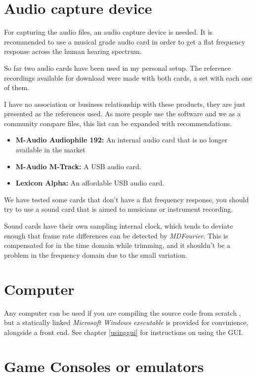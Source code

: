 \documentclass[10pt,a4paper]{report}
\begin{document}
\begin{appendices}
\section{Audio capture device}
\label{audiocards}
For capturing the audio files, an audio capture device is needed. It is recommended to use a musical grade audio card in order to get a flat frequency response across the human hearing spectrum.

So far two audio cards have been used in my personal setup. The reference recordings available for download were made with both cards, a set with each one of them.

I have no association or business relationship with these products, they are just presented as the references used. As more people use the software and we as a community compare files, this list can be expanded with recommendations.

\begin{itemize}
	\item \textbf{M-Audio Audiophile 192:} An internal audio card that is no longer available in the market \cite{maudio}
	\item \textbf{M-Audio M-Track:} A USB audio card. \cite{maudiomtrack}
	\item \textbf{Lexicon Alpha:} An affordable USB audio card. \cite{lexicon}
\end{itemize}

We have tested some cards that don't have a flat frequency response, you should try to use a sound card that is aimed to musicians or instrument recording.

Sound cards have their own sampling internal clock, which tends to deviate enough that frame rate differences can be detected by \textit{MDFourier}. This is compensated for in the time domain while trimming, and it shouldn't be a problem in the frequency domain due to the small variation. \cite{SoundCardClock}

\section{Computer}

Any computer can be used if you are compiling the source code from scratch \cite{sourcecode}, but a statically linked \textit{Microsoft Windows executable} is provided for convinience, alongside a front end. See chapter \ref{usinggui} for instructions on using the GUI.

\section{Game Consoles or emulators}


\end{appendices}
\end{document}
